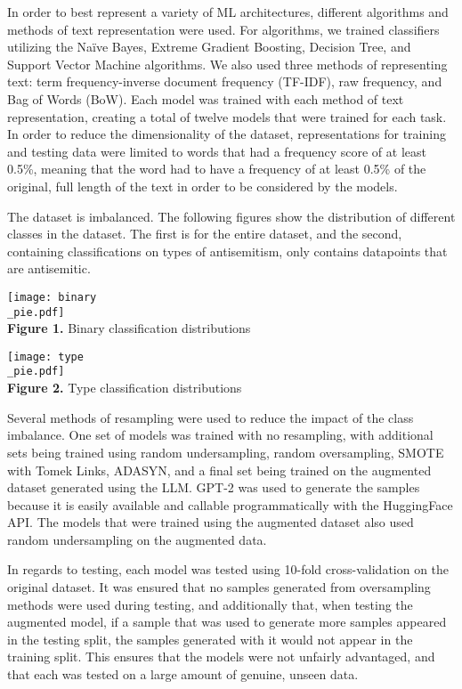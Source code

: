 \documentclass[runningheads]{llncs}
\newenvironment{nscenter}
 {\parskip=0pt\par\nopagebreak\centering}
 {\par\noindent\ignorespacesafterend}
\begin{document}
In order to best represent a variety of ML architectures, different algorithms and methods of text representation were used. For algorithms, we trained classifiers utilizing the Naïve Bayes, Extreme Gradient Boosting, Decision Tree, and Support Vector Machine algorithms. We also used three methods of representing text: term frequency-inverse document frequency (TF-IDF), raw frequency, and Bag of Words (BoW). Each model was trained with each method of text representation, creating a total of twelve models that were trained for each task. In order to reduce the dimensionality of the dataset, representations for training and testing data were limited to words that had a frequency score of at least 0.5\%, meaning that the word had to have a frequency of at least 0.5\% of the original, full length of the text in order to be considered by the models.

The dataset is imbalanced. The following figures show the distribution of different classes in the dataset. The first is for the entire dataset, and the second, containing classifications on types of antisemitism, only contains datapoints that are antisemitic.\\

\begin{center}
\texttt{[image: binary\\\_pie.pdf]}\\

{\bf Figure 1.} Binary classification distributions
\end{center}

\begin{nscenter}
\texttt{[image: type\\\_pie.pdf]}\\
{\bf Figure 2.} Type classification distributions
\end{nscenter}

Several methods of resampling were used to reduce the impact of the class imbalance. One set of models was trained with no resampling, with additional sets being trained using random undersampling, random oversampling, SMOTE with Tomek Links, ADASYN, and a final set being trained on the augmented dataset generated using the LLM. GPT-2 was used to generate the samples because it is easily available and callable programmatically with the HuggingFace API. The models that were trained using the augmented dataset also used random undersampling on the augmented data.

In regards to testing, each model was tested using 10-fold cross-validation on the original dataset. It was ensured that no samples generated from oversampling methods were used during testing, and additionally that, when testing the augmented model, if a sample that was used to generate more samples appeared in the testing split, the samples generated with it would not appear in the training split. This ensures that the models were not unfairly advantaged, and that each was tested on a large amount of genuine, unseen data.
\end{document}
